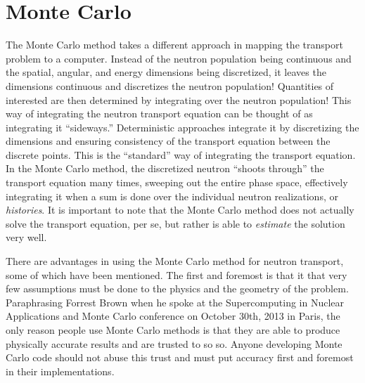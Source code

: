 \section{Monte Carlo}

The Monte Carlo method takes a different approach in mapping the transport problem to a computer.  Instead of the neutron population being continuous and the spatial, angular, and energy dimensions being discretized, it leaves the dimensions continuous and discretizes the neutron population!   Quantities of interested are then determined by integrating over the neutron population!   This way of integrating the neutron transport equation can be thought of as integrating it ``sideways.''   Deterministic approaches integrate it by discretizing the dimensions and ensuring consistency of the transport equation between the discrete points.  This is the ``standard'' way of integrating the transport equation.  In the Monte Carlo method, the discretized neutron ``shoots through'' the transport equation many times, sweeping out the entire phase space, effectively integrating it when a sum is done over the individual neutron realizations, or \emph{histories}.  It is important to note that the Monte Carlo method does not actually solve the transport equation, per se, but rather is able to \emph{estimate} the solution very well.

There are advantages in using the Monte Carlo method for neutron transport, some of which have been mentioned.  The first and foremost is that it that very few assumptions must be done to the physics and the geometry of the problem. Paraphrasing Forrest Brown when he spoke at the Supercomputing in Nuclear Applications and Monte Carlo conference on October 30th, 2013 in Paris,  the only reason people use Monte Carlo methods is that they are able to produce physically accurate results and are trusted to so so.  Anyone developing Monte Carlo code should not abuse this trust and must put accuracy first and foremost in their implementations.

